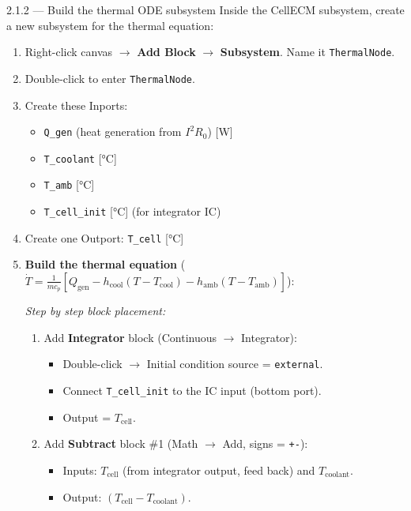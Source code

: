 \documentclass[11pt,a4paper]{article}
\begin{document}
\begin{guistep}{2.1.2 — Build the thermal ODE subsystem}
Inside the CellECM subsystem, create a new subsystem for the thermal equation:
\begin{enumerate}
    \item Right-click canvas $\to$ \textbf{Add Block} $\to$ \textbf{Subsystem}. Name it \texttt{ThermalNode}.
    \item Double-click to enter \texttt{ThermalNode}.
    \item Create these Inports:
    \begin{itemize}
        \item \texttt{Q\_gen} (heat generation from $I^2 R_0$) [W]
        \item \texttt{T\_coolant} [\si{\degreeCelsius}]
        \item \texttt{T\_amb} [\si{\degreeCelsius}]
        \item \texttt{T\_cell\_init} [\si{\degreeCelsius}] (for integrator IC)
    \end{itemize}
    \item Create one Outport: \texttt{T\_cell} [\si{\degreeCelsius}]
    \item \textbf{Build the thermal equation} ($\dot{T} = \frac{1}{m c_p}[Q_\text{gen} - h_\text{cool}(T - T_\text{cool}) - h_\text{amb}(T - T_\text{amb})]$):

    \textit{Step by step block placement:}

    \begin{enumerate}[label=\alph*)]
        \item Add \textbf{Integrator} block (Continuous $\to$ Integrator):
        \begin{itemize}
            \item Double-click $\to$ Initial condition source = \texttt{external}.
            \item Connect \texttt{T\_cell\_init} to the IC input (bottom port).
            \item Output = $T_\text{cell}$.
        \end{itemize}

        \item Add \textbf{Subtract} block \#1 (Math $\to$ Add, signs = \texttt{+-}):
        \begin{itemize}
            \item Inputs: $T_\text{cell}$ (from integrator output, feed back) and $T_\text{coolant}$.
            \item Output: $(T_\text{cell} - T_\text{coolant})$.
        \end{itemize}


\end{enumerate}
\end{enumerate}
\end{guistep}
\end{document}
